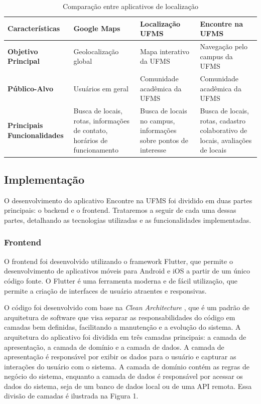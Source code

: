 \begin{table}[h]
    \begin{tabularx}{\textwidth}{|X|X|X|X|}
        \hline
        \textbf{Características} & \textbf{Google Maps} & \textbf{Localização UFMS} & \textbf{Encontre na UFMS} \\ \hline
        \textbf{Objetivo Principal} & Geolocalização global & Mapa interativo da UFMS & Navegação pelo campus da UFMS \\ \hline
        \textbf{Público-Alvo} & Usuários em geral & Comunidade acadêmica da UFMS & Comunidade acadêmica da UFMS \\ \hline
        \textbf{Principais Funcionalidades} & Busca de locais, rotas, informações de contato, horários de funcionamento & Busca de locais no campus, informações sobre pontos de interesse & Busca de locais, rotas, cadastro colaborativo de locais, avaliações de locais \\ \hline
    \end{tabularx}
    \caption{Comparação entre aplicativos de localização}
    \footnotesize  {}
    \label{tab:comparacao-aplicativos}
\end{table}

\subsection{Implementação}

    O desenvolvimento do aplicativo Encontre na UFMS foi dividido em duas partes principais: o backend e o frontend. Trataremos a seguir de cada uma dessas partes, detalhando as tecnologias utilizadas e as funcionalidades implementadas.

\subsubsection{Frontend}

    O frontend foi desenvolvido utilizando o framework Flutter, que permite o desenvolvimento de aplicativos móveis para Android e iOS a partir de um único código fonte. O Flutter é uma ferramenta moderna e de fácil utilização, que permite a criação de interfaces de usuário atraentes e responsivas.

    O código foi desenvolvido com base na \textit{Clean Architecture} \cite{cleanarchitecture}, que é um padrão de arquitetura de software que visa separar as responsabilidades do código em camadas bem definidas, facilitando a manutenção e a evolução do sistema. A arquitetura do aplicativo foi dividida em três camadas principais: a camada de apresentação, a camada de domínio e a camada de dados. A camada de apresentação é responsável por exibir os dados para o usuário e capturar as interações do usuário com o sistema. A camada de domínio contém as regras de negócio do sistema, enquanto a camada de dados é responsável por acessar os dados do sistema, seja de um banco de dados local ou de uma API remota. Essa divisão de camadas é ilustrada na Figura 1.


